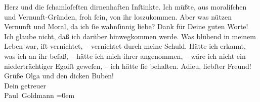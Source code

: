 \begin{ledgroupsized}[t]{13cm}
               Herz und die ſchamloſeſten dirnenhaften Inſtinkte. Ich müßte, aus moraliſchen und
               Vernunft-Gründen, froh ſein, von ihr loszukommen. Aber was nützen Vernunft und Moral,
               da ich ſie wahnſinnig liebe?\pend
           \pstart
           Dank für Deine guten Worte! {\pb}Ich glaube nicht, daß
               ich darüber hinwegkommen werde.  Was blühend in meinem Leben war, iſt vernichtet, –
               vernichtet durch meine Schuld. Hätte ich erkannt, was ich an ihr beſaß, – hätte ich
               mich ihrer angenommen, – wäre ich nicht ein niederträchtiger Egoiſt geweſen, – ich
               hätte ſie behalten.\pend
           \pstart
           Adieu, liebſter Freund! Grüße Olga und den
               dicken Buben! {\\[\baselineskip]}Dein
               getreuer {\\[\baselineskip]}\spacefill\mbox{Paul Goldmann}\pend
           \leftskip=0em{}
         
         \endnumbering{}\end{ledgroupsized}  \newcommand{\dateiname}{L03360}\newcommand{\titel}{Paul Goldmann an Arthur Schnitzler, 3. 1. [1903]}\newcommand{\editorInnen}{Martin Anton Müller und Laura Untner}
      